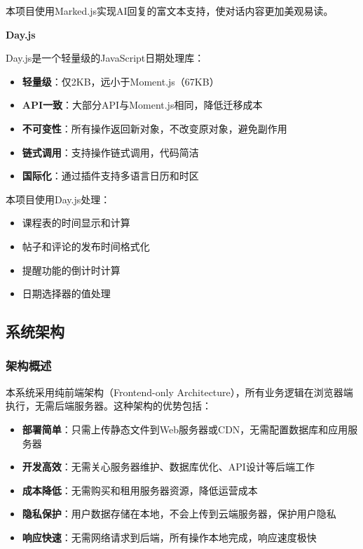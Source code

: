 \documentclass[12pt,a4paper]{article}
\begin{document}
本项目使用Marked.js实现AI回复的富文本支持，使对话内容更加美观易读。

\textbf{Day.js}

Day.js是一个轻量级的JavaScript日期处理库：

\begin{itemize}
    \item \textbf{轻量级}：仅2KB，远小于Moment.js（67KB）
    \item \textbf{API一致}：大部分API与Moment.js相同，降低迁移成本
    \item \textbf{不可变性}：所有操作返回新对象，不改变原对象，避免副作用
    \item \textbf{链式调用}：支持操作链式调用，代码简洁
    \item \textbf{国际化}：通过插件支持多语言日历和时区
\end{itemize}

本项目使用Day.js处理：

\begin{itemize}
    \item 课程表的时间显示和计算
    \item 帖子和评论的发布时间格式化
    \item 提醒功能的倒计时计算
    \item 日期选择器的值处理
\end{itemize}

\subsection{系统架构}

\subsubsection{架构概述}

本系统采用纯前端架构（Frontend-only Architecture），所有业务逻辑在浏览器端执行，无需后端服务器。这种架构的优势包括：

\begin{itemize}
    \item \textbf{部署简单}：只需上传静态文件到Web服务器或CDN，无需配置数据库和应用服务器
    \item \textbf{开发高效}：无需关心服务器维护、数据库优化、API设计等后端工作
    \item \textbf{成本降低}：无需购买和租用服务器资源，降低运营成本
    \item \textbf{隐私保护}：用户数据存储在本地，不会上传到云端服务器，保护用户隐私
    \item \textbf{响应快速}：无需网络请求到后端，所有操作本地完成，响应速度极快
\end{itemize}
\end{document}
